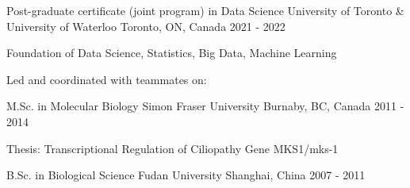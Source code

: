 


\begin{cventries}

\cventry
{Post-graduate certificate (joint program) in Data Science} %
{University of Toronto \& University of Waterloo} %
{Toronto, ON, Canada} %
{2021 - 2022} %
{ %
\begin{cvitems}
	\item {Foundation of Data Science, Statistics, Big Data, Machine Learning}
	\item {Led and coordinated with teammates on:
	}
\end{cvitems}
}

\cventry
{M.Sc. in Molecular Biology} %
{Simon Fraser University} %
{Burnaby, BC, Canada} %
{2011 - 2014} %
{ %
\begin{cvitems}
	\item {Thesis: Transcriptional Regulation of Ciliopathy Gene MKS1/mks-1}
\end{cvitems}
}

\cventry
{B.Sc. in Biological Science}
{Fudan University}
{Shanghai, China}
{2007 - 2011}
{}

\end{cventries}